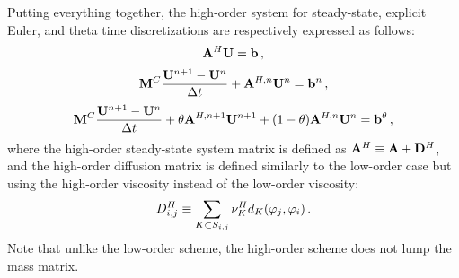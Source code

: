 Putting everything together, the high-order system for steady-state,
explicit Euler, and theta time discretizations are respectively expressed
as follows:
\begin{equation}\label{eq:high_ss}
  \mathbf{A}^H \mathbf{U} = \mathbf{b} \,,
\end{equation}
\begin{equation}\label{eq:high_fe}
  \mathbf{M}^C\frac{\mathbf{U}^{n+1} - \mathbf{U}^n}{\Delta t} + \mathbf{A}^{H,n}\mathbf{U}^n = \mathbf{b}^n \,,
\end{equation}
\begin{equation}\label{eq:high_theta}
  \mathbf{M}^C\frac{\mathbf{U}^{n+1} - \mathbf{U}^n}{\Delta t} + \theta\mathbf{A}^{H,n+1}\mathbf{U}^{n+1}
    + (1-\theta)\mathbf{A}^{H,n}\mathbf{U}^n
    = \mathbf{b}^\theta \,,
\end{equation}
where the high-order steady-state system matrix is defined as
$\mathbf{A}^H\equiv\mathbf{A} + \mathbf{D}^H$, and the high-order diffusion matrix is defined similarly
to the low-order case but using the high-order viscosity instead of the low-order
viscosity:
\begin{equation}\label{eq:high_order_diffusion_matrix}
  D_{i,j}^H \equiv
    \sum\limits_{K\subset S_{i,j}}\nu^H_K
    d_K(\varphi_j,\varphi_i) \,.
\end{equation}
Note that unlike the low-order scheme, the high-order scheme does not lump the
mass matrix.
